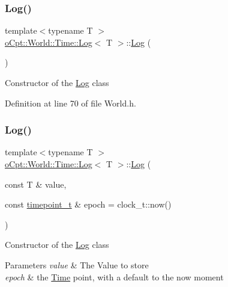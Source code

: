 \subsubsection{\texorpdfstring{Log()}{Log()}\hspace{0.1cm}{\footnotesize\ttfamily [1/2]}}
{\footnotesize\ttfamily template$<$typename T $>$ \\
\hyperlink{classo_cpt_1_1_world_1_1_time_1_1_log}{o\+Cpt\+::\+World\+::\+Time\+::\+Log}$<$ T $>$\+::\hyperlink{classo_cpt_1_1_world_1_1_time_1_1_log}{Log} (\begin{DoxyParamCaption}{ }\end{DoxyParamCaption})\hspace{0.3cm}{\ttfamily [inline]}}

Constructor of the \hyperlink{classo_cpt_1_1_world_1_1_time_1_1_log}{Log} class 

Definition at line 70 of file World.\+h.

\hypertarget{classo_cpt_1_1_world_1_1_time_1_1_log_aa404e83afcd8ab1f52d58cf4fb8c8972}{}\label{classo_cpt_1_1_world_1_1_time_1_1_log_aa404e83afcd8ab1f52d58cf4fb8c8972} 
\subsubsection{\texorpdfstring{Log()}{Log()}\hspace{0.1cm}{\footnotesize\ttfamily [2/2]}}
{\footnotesize\ttfamily template$<$typename T $>$ \\
\hyperlink{classo_cpt_1_1_world_1_1_time_1_1_log}{o\+Cpt\+::\+World\+::\+Time\+::\+Log}$<$ T $>$\+::\hyperlink{classo_cpt_1_1_world_1_1_time_1_1_log}{Log} (\begin{DoxyParamCaption}\item[{const T \&}]{value,  }\item[{const \hyperlink{classo_cpt_1_1_world_1_1_time_a6a6e782c3c90622c1c7070b0a223ec4c}{timepoint\+\_\+t} \&}]{epoch = {\ttfamily clock\+\_\+t\+:\+:now()} }\end{DoxyParamCaption})\hspace{0.3cm}{\ttfamily [inline]}}

Constructor of the \hyperlink{classo_cpt_1_1_world_1_1_time_1_1_log}{Log} class 
\begin{DoxyParams}{Parameters}
{\em value} & The Value to store \\
\hline
{\em epoch} & the \hyperlink{classo_cpt_1_1_world_1_1_time}{Time} point, with a default to the now moment \\
\hline
\end{DoxyParams}


